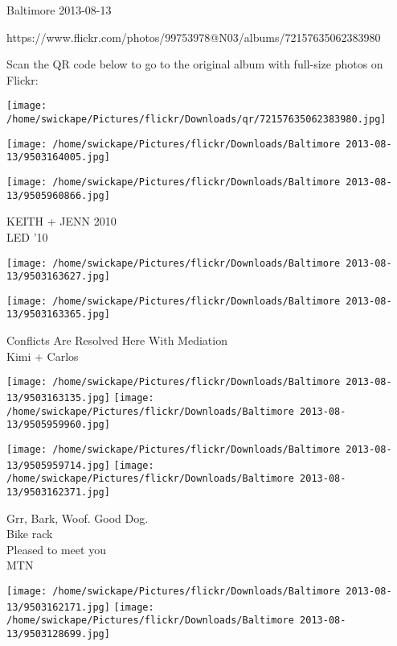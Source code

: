 \documentclass[10pt,letterpaper]{article}
\begin{document}
Baltimore 2013-08-13

https://www.flickr.com/photos/99753978@N03/albums/72157635062383980

Scan the QR code below to go to the original album with full-size photos on Flickr:

\texttt{[image: /home/swickape/Pictures/flickr/Downloads/qr/72157635062383980.jpg]}
\pagebreak

\texttt{[image: /home/swickape/Pictures/flickr/Downloads/Baltimore 2013-08-13/9503164005.jpg]}

\vspace{0.25in}
\texttt{[image: /home/swickape/Pictures/flickr/Downloads/Baltimore 2013-08-13/9505960866.jpg]}

KEITH + JENN 2010\\
LED '10\\
\pagebreak

\texttt{[image: /home/swickape/Pictures/flickr/Downloads/Baltimore 2013-08-13/9503163627.jpg]}

\vspace{0.25in}
\texttt{[image: /home/swickape/Pictures/flickr/Downloads/Baltimore 2013-08-13/9503163365.jpg]}

Conflicts Are Resolved Here With Mediation\\
Kimi + Carlos\\
\pagebreak

\texttt{[image: /home/swickape/Pictures/flickr/Downloads/Baltimore 2013-08-13/9503163135.jpg]}
\texttt{[image: /home/swickape/Pictures/flickr/Downloads/Baltimore 2013-08-13/9505959960.jpg]}

\texttt{[image: /home/swickape/Pictures/flickr/Downloads/Baltimore 2013-08-13/9505959714.jpg]}
\texttt{[image: /home/swickape/Pictures/flickr/Downloads/Baltimore 2013-08-13/9503162371.jpg]}

Grr, Bark, Woof.  Good Dog.\\
Bike rack\\
Pleased to meet you\\
MTN\\
\pagebreak

\texttt{[image: /home/swickape/Pictures/flickr/Downloads/Baltimore 2013-08-13/9503162171.jpg]}
\texttt{[image: /home/swickape/Pictures/flickr/Downloads/Baltimore 2013-08-13/9503128699.jpg]}
\end{document}
